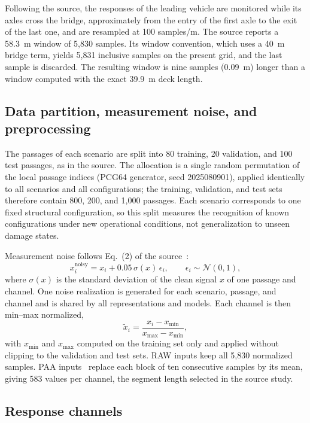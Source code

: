 Following the source, the responses of the leading vehicle are monitored while
its axles cross the bridge, approximately from the entry of the first axle to
the exit of the last one, and are resampled at 100 samples/m. The source reports
a 58.3~m window of 5,830 samples. Its window convention, which uses a 40~m
bridge term, yields 5,831 inclusive samples on the present grid, and the last
sample is discarded. The resulting window is nine samples (0.09~m) longer than
a window computed with the exact 39.9~m deck length.

\subsection{Data partition, measurement noise, and preprocessing}

The passages of each scenario are split into 80 training, 20 validation, and
100 test passages, as in the source. The allocation is a single random
permutation of the local passage indices (PCG64 generator, seed 2025080901),
applied identically to all scenarios and all configurations; the training,
validation, and test sets therefore contain 800, 200, and 1,000 passages. Each
scenario corresponds to one fixed structural configuration, so this split
measures the recognition of known configurations under new operational
conditions, not generalization to unseen damage states.

Measurement noise follows Eq.~(2) of the source~\cite{fernandes2025early}:
\begin{equation}
    x^{\mathrm{noisy}}_i=x_i+0.05\,\sigma(x)\,\epsilon_i,
    \qquad \epsilon_i\sim\mathcal{N}(0,1),
    \label{eq:f25_noise}
\end{equation}
where $\sigma(x)$ is the standard deviation of the clean signal $x$ of one
passage and channel. One noise realization is generated for each scenario,
passage, and channel and is shared by all representations and models. Each
channel is then min--max normalized,
\begin{equation}
    \tilde{x}_i=\frac{x_i-x_{\min}}{x_{\max}-x_{\min}},
\end{equation}
with $x_{\min}$ and $x_{\max}$ computed on the training set only and applied
without clipping to the validation and test sets. RAW inputs keep all 5,830
normalized samples. PAA inputs~\cite{keogh2001dimensionality} replace each
block of ten consecutive samples by its mean, giving 583 values per channel, the
segment length selected in the source study.

\subsection{Response channels}

